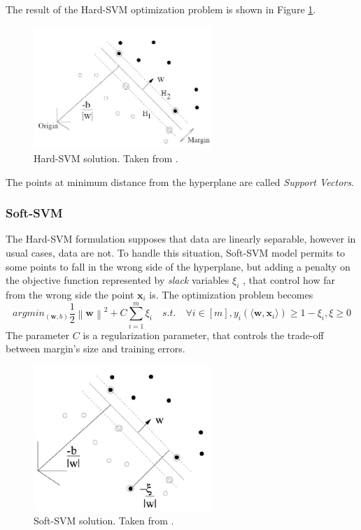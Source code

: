 The result of the Hard-\ac{SVM} optimization problem is shown in Figure \ref{fig:hard-svm}.

\begin{figure}[ht]
	\centering
	\includegraphics[width=0.6\textwidth]{figures/hard-svm.jpg}
	\caption{Hard-SVM solution. Taken from \cite{Pinault2015ModellingWK}.}
	\label{fig:hard-svm}
\end{figure}

The points at minimum distance from the hyperplane are called \textit{Support Vectors}.

\subsubsection{Soft-SVM}

The Hard-\ac{SVM} formulation supposes that data are linearly separable, however in usual cases, data are not. To handle this situation, Soft-\ac{SVM} model permits to some points to fall in the wrong side of the hyperplane, but adding a penalty on the objective function represented by \textit{slack} variables $\xi _i$ , that control how far from the wrong side the point $\mathbf{x}_i$ is. The optimization problem becomes
\[ argmin_{(\mathbf{w}, b)} \frac{1}{2} \left\lVert \mathbf{w} \right\rVert ^2 + C \sum_{i=1}^{m} \xi_i \quad s.t. \quad \forall i \in [m], y_i (\langle \mathbf{w}, \mathbf{x}_i \rangle) \ge 1 - \xi_i , \xi \ge 0  \]
The parameter $C$ is a regularization parameter, that controls the trade-off between margin's size and training errors. 

\begin{figure}[ht]
	\centering
	\includegraphics[width=0.6\textwidth]{figures/soft-svm.jpg}
	\caption{Soft-SVM solution. Taken from \cite{Pinault2015ModellingWK}.}%
	\label{fig:soft-svm}
\end{figure}

